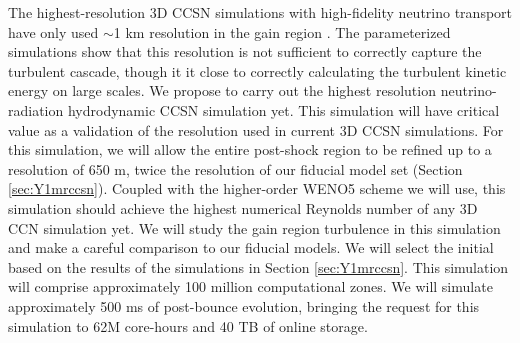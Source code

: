 The highest-resolution 3D CCSN simulations with high-fidelity neutrino transport have only used $\sim$1 km resolution in the gain region \citep{Roberts:2016, OConnor:2017}.
The parameterized simulations \citet{Radice:2016} show that this resolution is not sufficient to correctly capture the turbulent cascade, though it it close to correctly calculating the turbulent kinetic energy on large scales.
We propose to carry out the highest resolution neutrino-radiation hydrodynamic CCSN simulation yet.
This simulation will have critical value as a validation of the resolution used in current 3D CCSN simulations.
For this simulation, we will allow the entire post-shock region to be refined up to a resolution of 650 m, twice the resolution of our fiducial model set (Section \ref{sec:Y1mrccsn}).
Coupled with the higher-order WENO5 scheme we will use, this simulation should achieve the highest numerical Reynolds number of any 3D CCN simulation yet.
We will study the gain region turbulence in this simulation and make a careful comparison to our fiducial models.
We will select the initial based on the results of the simulations in Section \ref{sec:Y1mrccsn}.
This simulation will comprise approximately 100 million computational zones.
We will simulate approximately 500 ms of post-bounce evolution, bringing the request for this simulation to 62M core-hours and 40 TB of online storage.

